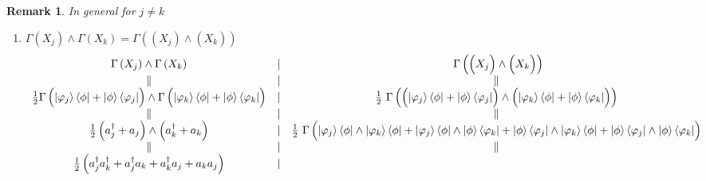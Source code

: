 \documentclass[aps,preprint]{revtex4}%
\newtheorem{remark}[theorem]{Remark}
\begin{document}
\begin{remark}
In general for $j\neq k$

\begin{enumerate}
\item $\Gamma\left(  X_{j}\right)  \wedge\Gamma\left(  X_{k}\right)
=\Gamma\left(  \left(  \overset{}{X_{j}}\right)  \wedge\left(
\overset{}{X_{k}}\right)  \right)  $%
\begin{equation}%
\begin{array}
[c]{ccc}%
\Gamma\left(  X_{j}\right)  \wedge\Gamma\left(  X_{k}\right)  & {\LARGE \mid}
& \ \Gamma\left(  \left(  \overset{}{X_{j}}\right)  \wedge\left(
\overset{}{X_{k}}\right)  \right) \\
\parallel & {\LARGE \mid} & \parallel\\
\frac{1}{2}\Gamma\left(  \overset{}{\left\vert \varphi_{j}\right\rangle
\left\langle \phi\right\vert +\left\vert \phi\right\rangle \left\langle
\varphi_{j}\right\vert }\right)  \wedge\Gamma\left(  \overset{}{\left\vert
\varphi_{k}\right\rangle \left\langle \phi\right\vert +\left\vert
\phi\right\rangle \left\langle \varphi_{k}\right\vert }\right)  &
{\LARGE \mid} & \frac{1}{2}\ \Gamma\left(  \left(  \overset{}{\left\vert
\varphi_{j}\right\rangle \left\langle \phi\right\vert +\left\vert
\phi\right\rangle \left\langle \varphi_{j}\right\vert }\right)  \wedge\left(
\overset{}{\left\vert \varphi_{k}\right\rangle \left\langle \phi\right\vert
+\left\vert \phi\right\rangle \left\langle \varphi_{k}\right\vert }\right)
\right) \\
\parallel & {\LARGE \mid} & \parallel\\
\frac{1}{2}\left(  a_{j}^{\dagger}+a_{j}\right)  \wedge\left(  a_{k}^{\dagger
}+a_{k}\right)  & {\LARGE \mid} & \frac{1}{2}\ \Gamma\left(
\overset{}{\left\vert \varphi_{j}\right\rangle \left\langle \phi\right\vert
\wedge\left\vert \varphi_{k}\right\rangle \left\langle \phi\right\vert
+\left\vert \varphi_{j}\right\rangle \left\langle \phi\right\vert }%
\wedge\left\vert \phi\right\rangle \left\langle \varphi_{k}\right\vert
+\overset{}{\left\vert \phi\right\rangle \left\langle \varphi_{j}\right\vert
\wedge\left\vert \varphi_{k}\right\rangle \left\langle \phi\right\vert
+\left\vert \phi\right\rangle \left\langle \varphi_{j}\right\vert }%
\wedge\left\vert \phi\right\rangle \left\langle \varphi_{k}\right\vert \right)
\\
\parallel & {\LARGE \mid} & \parallel\\
\frac{1}{2}\left(  a_{j}^{\dagger}a_{k}^{\dagger}+a_{j}^{\dagger}a_{k}%
+a_{k}^{\dagger}a_{j}+a_{k}a_{j}\right)  & {\LARGE \mid} &

\end{array}
\end{equation}
\end{enumerate}
\end{remark}
\end{document}

